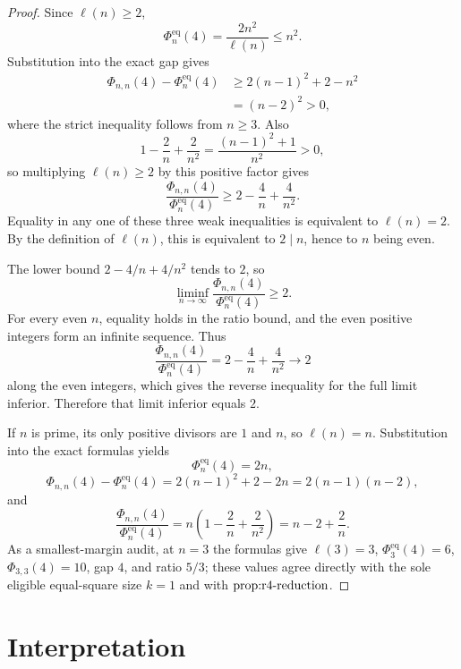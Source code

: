 \documentclass{article}
\begin{document}
\begin{proof}
Since \(\ell(n)\ge2\),
\[
\Phi_n^{\mathrm{eq}}(4)=\frac{2n^2}{\ell(n)}\le n^2.
\]
Substitution into the exact gap gives
\[
\begin{aligned}
\Phi_{n,n}(4)-\Phi_n^{\mathrm{eq}}(4)
&\ge2(n-1)^2+2-n^2\\
&=(n-2)^2>0,
\end{aligned}
\]
where the strict inequality follows from \(n\ge3\). Also
\[
1-\frac2n+\frac{2}{n^2}
=\frac{(n-1)^2+1}{n^2}>0,
\]
so multiplying \(\ell(n)\ge2\) by this positive factor gives
\[
\frac{\Phi_{n,n}(4)}{\Phi_n^{\mathrm{eq}}(4)}
\ge2-\frac4n+\frac4{n^2}.
\]
Equality in any one of these three weak inequalities is equivalent to \(\ell(n)=2\). By the definition of \(\ell(n)\), this is equivalent to \(2\mid n\), hence to \(n\) being even.

The lower bound \(2-4/n+4/n^2\) tends to \(2\), so
\[
\liminf_{n\to\infty}
\frac{\Phi_{n,n}(4)}{\Phi_n^{\mathrm{eq}}(4)}\ge2.
\]
For every even \(n\), equality holds in the ratio bound, and the even positive integers form an infinite sequence. Thus
\[
\frac{\Phi_{n,n}(4)}{\Phi_n^{\mathrm{eq}}(4)}
=2-\frac4n+\frac4{n^2}\longrightarrow2
\]
along the even integers, which gives the reverse inequality for the full limit inferior. Therefore that limit inferior equals \(2\).

If \(n\) is prime, its only positive divisors are \(1\) and \(n\), so \(\ell(n)=n\). Substitution into the exact formulas yields
\[
\Phi_n^{\mathrm{eq}}(4)=2n,
\]
\[
\Phi_{n,n}(4)-\Phi_n^{\mathrm{eq}}(4)
=2(n-1)^2+2-2n
=2(n-1)(n-2),
\]
and
\[
\frac{\Phi_{n,n}(4)}{\Phi_n^{\mathrm{eq}}(4)}
=n\left(1-\frac2n+\frac{2}{n^2}\right)
=n-2+\frac2n.
\]
As a smallest-margin audit, at \(n=3\) the formulas give \(\ell(3)=3\), \(\Phi_3^{\mathrm{eq}}(4)=6\), \(\Phi_{3,3}(4)=10\), gap \(4\), and ratio \(5/3\); these values agree directly with the sole eligible equal-square size \(k=1\) and with \(\textnormal{prop:r4-reduction}\).
\end{proof}

\section{Interpretation}
\end{document}
